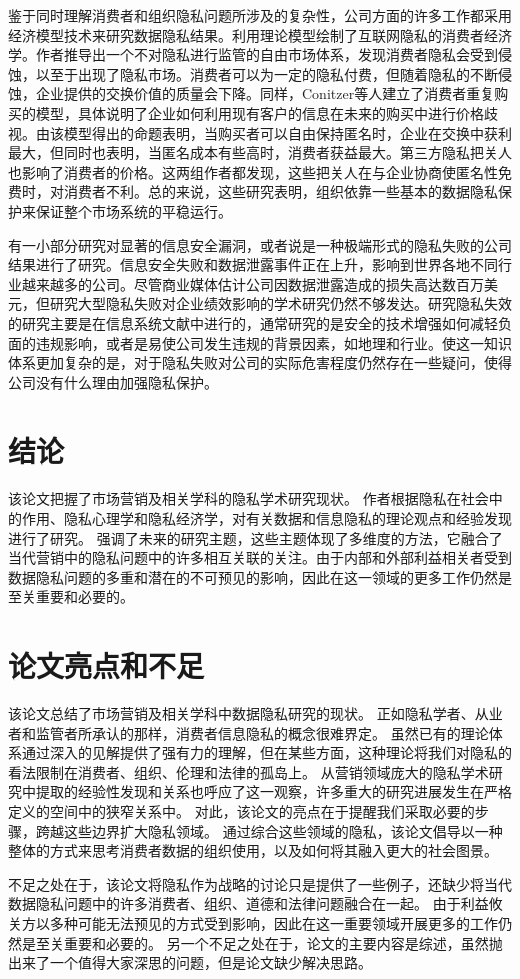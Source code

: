 \documentclass[degree=project,degree-type=project,cjk-font=windows]{thuthesis}
\begin{document}
鉴于同时理解消费者和组织隐私问题所涉及的复杂性，公司方面的许多工作都采用经济模型技术来研究数据隐私结果。\cite{Rust}利用理论模型绘制了互联网隐私的消费者经济学。作者推导出一个不对隐私进行监管的自由市场体系，发现消费者隐私会受到侵蚀，以至于出现了隐私市场。消费者可以为一定的隐私付费，但随着隐私的不断侵蚀，企业提供的交换价值的质量会下降。同样，Conitzer等人建立了消费者重复购买的模型，具体说明了企业如何利用现有客户的信息在未来的购买中进行价格歧视。由该模型得出的命题表明，当购买者可以自由保持匿名时，企业在交换中获利最大，但同时也表明，当匿名成本有些高时，消费者获益最大。第三方隐私把关人也影响了消费者的价格。这两组作者都发现，这些把关人在与企业协商使匿名性免费时，对消费者不利。总的来说，这些研究表明，组织依靠一些基本的数据隐私保护来保证整个市场系统的平稳运行。

有一小部分研究对显著的信息安全漏洞，或者说是一种极端形式的隐私失败的公司结果进行了研究。信息安全失败和数据泄露事件正在上升，影响到世界各地不同行业越来越多的公司。尽管商业媒体估计公司因数据泄露造成的损失高达数百万美元，但研究大型隐私失败对企业绩效影响的学术研究仍然不够发达。研究隐私失效的研究主要是在信息系统文献中进行的，通常研究的是安全的技术增强如何减轻负面的违规影响，或者是易使公司发生违规的背景因素，如地理和行业。使这一知识体系更加复杂的是，对于隐私失败对公司的实际危害程度仍然存在一些疑问，使得公司没有什么理由加强隐私保护。

\chapter{结论}
\label{chap3}

该论文把握了市场营销及相关学科的隐私学术研究现状。
作者根据隐私在社会中的作用、隐私心理学和隐私经济学，对有关数据和信息隐私的理论观点和经验发现进行了研究。
强调了未来的研究主题，这些主题体现了多维度的方法，它融合了当代营销中的隐私问题中的许多相互关联的关注。由于内部和外部利益相关者受到数据隐私问题的多重和潜在的不可预见的影响，因此在这一领域的更多工作仍然是至关重要和必要的。

\chapter{论文亮点和不足}
\label{chap4}

该论文总结了市场营销及相关学科中数据隐私研究的现状。
正如隐私学者、从业者和监管者所承认的那样，消费者信息隐私的概念很难界定。
虽然已有的理论体系通过深入的见解提供了强有力的理解，但在某些方面，这种理论将我们对隐私的看法限制在消费者、组织、伦理和法律的孤岛上。
从营销领域庞大的隐私学术研究中提取的经验性发现和关系也呼应了这一观察，许多重大的研究进展发生在严格定义的空间中的狭窄关系中。
对此，该论文的亮点在于提醒我们采取必要的步骤，跨越这些边界扩大隐私领域。
通过综合这些领域的隐私，该论文倡导以一种整体的方式来思考消费者数据的组织使用，以及如何将其融入更大的社会图景。

不足之处在于，该论文将隐私作为战略的讨论只是提供了一些例子，还缺少将当代数据隐私问题中的许多消费者、组织、道德和法律问题融合在一起。
由于利益攸关方以多种可能无法预见的方式受到影响，因此在这一重要领域开展更多的工作仍然是至关重要和必要的。
另一个不足之处在于，论文的主要内容是综述，虽然抛出来了一个值得大家深思的问题，但是论文缺少解决思路。

\backmatter


\appendix
\end{document}
